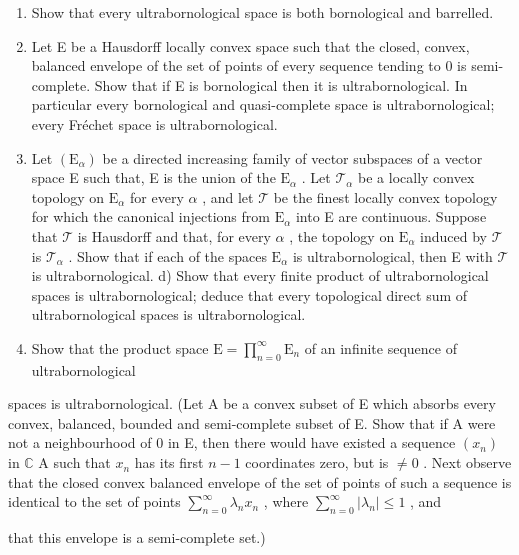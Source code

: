 \begin{enumerate}
\def\labelenumi{\alph{enumi})}
\item
  Show that every ultrabornological space is both bornological and barrelled.
\item
  Let E be a Hausdorff locally convex space such that the closed, convex, balanced envelope of the set of points of every sequence tending to 0 is semi-complete. Show that if E is bornological then it is ultrabornological. In particular every bornological and quasi-complete space is ultrabornological; every Fréchet space is ultrabornological.
\item
  Let \((\mathrm{E}_{\alpha})\) be a directed increasing family of vector subspaces of a vector space E such that, E is the union of the \(\mathrm{E}_{\alpha}\) . Let \(\mathcal{T}_{\alpha}\) be a locally convex topology on \(\mathrm{E}_{\alpha}\) for every \(\alpha\) , and let \(\mathcal{T}\) be the finest locally convex topology for which the canonical injections from \(\mathrm{E}_{\alpha}\) into E are continuous. Suppose that \(\mathcal{T}\) is Hausdorff and that, for every \(\alpha\) , the topology on \(\mathrm{E}_{\alpha}\) induced by \(\mathcal{T}\) is \(\mathcal{T}_{\alpha}\) . Show that if each of the spaces \(\mathrm{E}_{\alpha}\) is ultrabornological, then E with \(\mathcal{T}\) is ultrabornological. d) Show that every finite product of ultrabornological spaces is ultrabornological; deduce that every topological direct sum of ultrabornological spaces is ultrabornological.
\item
  Show that the product space \(\mathrm{E} = \prod_{n=0}^{\infty} \mathrm{E}_n\) of an infinite sequence of ultrabornological
\end{enumerate}

spaces is ultrabornological. (Let A be a convex subset of E which absorbs every convex, balanced, bounded and semi-complete subset of E. Show that if A were not a neighbourhood of 0 in E, then there would have existed a sequence \((x_{n})\) in \(\mathbb{C}\) A such that \(x_{n}\) has its first \(n - 1\) coordinates zero, but is \(\neq 0\) . Next observe that the closed convex balanced envelope of the set of points of such a sequence is identical to the set of points \(\sum_{n = 0}^{\infty}\lambda_n x_n\) , where \(\sum_{n = 0}^{\infty}|\lambda_n| \leqslant 1\) , and

that this envelope is a semi-complete set.)

